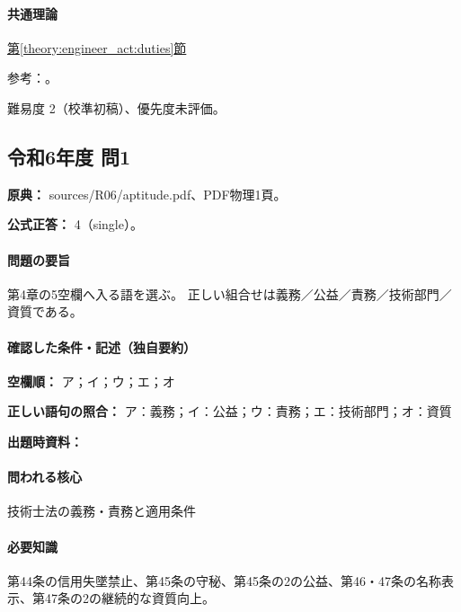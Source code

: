 \paragraph{共通理論} \hyperref[theory:engineer_act:duties]{第\ref*{theory:engineer_act:duties}節}

\par 参考：\cite{engineer_act_current}。

\par 難易度 2（校準初稿）、優先度未評価。

\subsection{令和6年度 問1}
\label{q:r06-reg-apt-01}

\noindent\textbf{原典：} sources/R06/aptitude.pdf、PDF物理1頁。

\textbf{公式正答：} 4（single）。

\paragraph{問題の要旨} 第4章の5空欄へ入る語を選ぶ。 正しい組合せは義務／公益／責務／技術部門／資質である。

\paragraph{確認した条件・記述（独自要約）}\mbox{}\par

\noindent\textbf{空欄順：} ア；イ；ウ；エ；オ\par

\noindent\textbf{正しい語句の照合：} ア：義務；イ：公益；ウ：責務；エ：技術部門；オ：資質\par

\noindent\textbf{出題時資料：} \par

\paragraph{問われる核心} 技術士法の義務・責務と適用条件

\paragraph{必要知識} 第44条の信用失墜禁止、第45条の守秘、第45条の2の公益、第46・47条の名称表示、第47条の2の継続的な資質向上。

